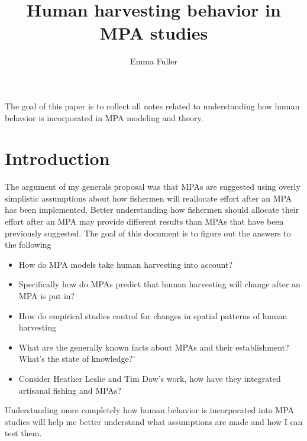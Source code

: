 \documentclass[12pt, a4paper]{article}
\title{Human harvesting behavior in MPA studies}
\author{Emma Fuller}
\date{} 	%
\begin{document}
\maketitle

The goal of this paper is to collect all notes related to understanding how human behavior is incorporated in MPA modeling and theory. 

\tableofcontents


\section{Introduction}
The argument of my generals proposal was that MPAs are suggested using overly simplistic assumptions about how fishermen will reallocate effort after an MPA has been implemented. Better understanding how fishermen should allocate their effort after an MPA may provide different results than MPAs that have been previously suggested. The goal of this document is to figure out the answers to the following

\begin{itemize}
\item How do MPA models take human harvesting into account?
\item Specifically how do MPAs predict that human harvesting will change after an MPA is put in? 
\item How do empirical studies control for changes in spatial patterns of human harvesting
\item What are the generally known facts about MPAs and their establishment? What's the state of knowledge?'
\item Consider Heather Leslie and Tim Daw's work, how have they integrated artisanal fishing and MPAs?
\end{itemize}

\noindent Understanding more completely how human behavior is incorporated into MPA studies will help me better understand what assumptions are made and how I can test them. 



\end{document}
